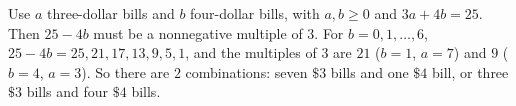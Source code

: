 Use $a$ three-dollar bills and $b$ four-dollar bills, with $a,b\ge0$ and $3a+4b=25$. Then $25-4b$ must be a nonnegative multiple of $3$. For $b=0,1,\dots,6$, $25-4b=25,21,17,13,9,5,1$, and the multiples of $3$ are $21$ ($b=1$, $a=7$) and $9$ ($b=4$, $a=3$). So there are $\boxed{2}$ combinations: seven $\$3$ bills and one $\$4$ bill, or three $\$3$ bills and four $\$4$ bills.
